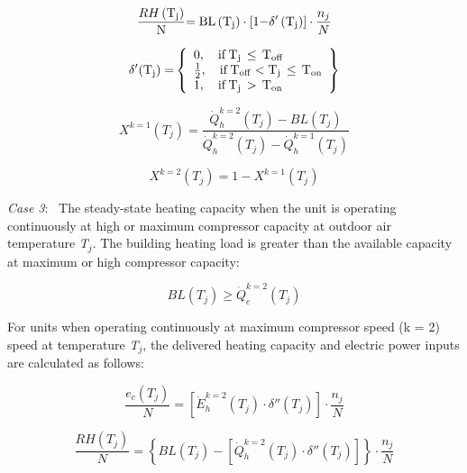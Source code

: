 \begin{equation}
\frac{{RH\left( {{{\rm{T}}_{\rm{j}}}} \right)}}{{\rm{N}}}{\rm{ = BL}}\left( {{{\rm{T}}_{\rm{j}}}} \right) \cdot \left[ {{\rm{1 - }}{{\rm{\delta }}^\prime}\left( {{{\rm{T}}_{\rm{j}}}} \right)} \right] \cdot \frac{{{n_j}}}{N}
\end{equation}

\begin{equation}
{\delta ^\prime}{\rm{(}}{{\rm{T}}_{\rm{j}}}{\rm{) = }}\left\{ \begin{array}{l}0,\quad {\rm{if}}\,{{\rm{T}}_{\rm{j}}}\, \le \,{{\rm{T}}_{{\rm{off}}}}\,\\ {\frac{1}{2}},\quad {\rm{if}}\,{{\rm{T}}_{{\rm{off}}}} < {{\rm{T}}_{\rm{j}}}\, \le \,{{\rm{T}}_{{\rm{on}}}}\\ 1,\quad {\rm{if}}\,{{\rm{T}}_{\rm{j}}}\, > \,{{\rm{T}}_{{\rm{on}}}}\end{array} \right\}
\end{equation}

\begin{equation}
{X^{k = 1}}({T_j}) = \frac{{\dot Q_h^{k = 2}({T_j}) - BL({T_j})}}{{\dot Q_h^{k = 2}({T_j}) - \dot Q_h^{k = 1}({T_j})}}
\end{equation}

\begin{equation}
{X^{k = 2}}({T_j}) = 1 - {X^{k = 1}}({T_j})
\end{equation}

\emph{Case 3}:~ The steady-state heating capacity when the unit is operating continuously at high or maximum compressor capacity at outdoor air temperature \emph{T\(_{j}\)}. The building heating load is greater than the available capacity at maximum or high compressor capacity:

\begin{equation}
BL\left( {{T_j}} \right) \ge \dot Q_c^{k = 2}\left( {{T_j}} \right)
\end{equation}

For units when operating continuously at maximum compressor speed (k = 2) speed at temperature \emph{T\(_{j}\)}, the delivered heating capacity and electric power inputs are calculated as follows:

\begin{equation}
  \frac{e_c(T_j)}{N} = \left[ \dot{E}_h^{k = 2}(T_j) \cdot \delta''(T_j) \right] \cdot \frac{n_j}{N}
\end{equation}

\begin{equation}
  \frac{RH(T_j)}{N} = \left\{ BL(T_j) - \left[\dot{Q}_h^{k = 2}(T_j) \cdot \delta''(T_j) \right] \right\} \cdot \frac{n_j}{N}
\end{equation}

